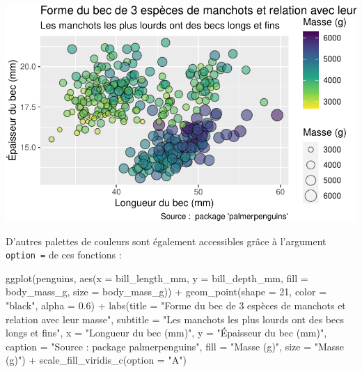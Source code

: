 \documentclass[
  a4paper,
  DIV=11,
  numbers=noendperiod,
  oneside]{scrreprt}
\newenvironment{Shaded}{}{}
\newcommand{\AttributeTok}[1]{\textcolor[rgb]{0.84,0.23,0.29}{#1}}
\newcommand{\DecValTok}[1]{\textcolor[rgb]{0.00,0.36,0.77}{#1}}
\newcommand{\FloatTok}[1]{\textcolor[rgb]{0.00,0.36,0.77}{#1}}
\newcommand{\FunctionTok}[1]{\textcolor[rgb]{0.44,0.26,0.76}{#1}}
\newcommand{\NormalTok}[1]{\textcolor[rgb]{0.14,0.16,0.18}{#1}}
\newcommand{\SpecialCharTok}[1]{\textcolor[rgb]{0.00,0.36,0.77}{#1}}
\newcommand{\StringTok}[1]{\textcolor[rgb]{0.01,0.18,0.38}{#1}}
\begin{document}
\includegraphics{03-visualization_files/figure-pdf/unnamed-chunk-91-1.pdf}

D'autres palettes de couleurs sont également accessibles grâce à
l'argument \texttt{option\ =} de ces fonctions :

\begin{Shaded}
\begin{Highlighting}[]
\FunctionTok{ggplot}\NormalTok{(penguins, }\FunctionTok{aes}\NormalTok{(}\AttributeTok{x =}\NormalTok{ bill\_length\_mm, }\AttributeTok{y =}\NormalTok{ bill\_depth\_mm,}
                     \AttributeTok{fill =}\NormalTok{ body\_mass\_g, }\AttributeTok{size =}\NormalTok{ body\_mass\_g)) }\SpecialCharTok{+}
  \FunctionTok{geom\_point}\NormalTok{(}\AttributeTok{shape =} \DecValTok{21}\NormalTok{, }\AttributeTok{color =} \StringTok{"black"}\NormalTok{, }\AttributeTok{alpha =} \FloatTok{0.6}\NormalTok{) }\SpecialCharTok{+}
  \FunctionTok{labs}\NormalTok{(}\AttributeTok{title =} \StringTok{"Forme du bec de 3 espèces de manchots et relation avec leur masse"}\NormalTok{,}
       \AttributeTok{subtitle =} \StringTok{"Les manchots les plus lourds ont des becs longs et fins"}\NormalTok{,}
       \AttributeTok{x =} \StringTok{"Longueur du bec (mm)"}\NormalTok{,}
       \AttributeTok{y =} \StringTok{"Épaisseur du bec (mm)"}\NormalTok{,}
       \AttributeTok{caption =} \StringTok{"Source :  package \textquotesingle{}palmerpenguins\textquotesingle{}"}\NormalTok{,}
       \AttributeTok{fill =} \StringTok{"Masse (g)"}\NormalTok{,}
       \AttributeTok{size =} \StringTok{"Masse (g)"}\NormalTok{) }\SpecialCharTok{+}
  \FunctionTok{scale\_fill\_viridis\_c}\NormalTok{(}\AttributeTok{option =} \StringTok{"A"}\NormalTok{)}
\end{Highlighting}
\end{Shaded}
\end{document}

